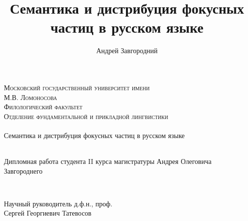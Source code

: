 \documentclass[a4paper, titlepage, 12pt]{article}
\title{Семантика и дистрибуция фокусных частиц в русском языке}
\author{Андрей Завгородний}
\begin{document}
\begin{titlepage}

\newcommand{\HRule}{\rule{\linewidth}{0.5mm}} %

\center %
 

\textsc{\large Московский государственный университет имени \\ М.В. Ломоносова}\\[1.5cm] %
\textsc{\large Филологический факультет}\\[0.5cm] %
\textsc{\large Отделение фундаментальной и прикладной лингвистики}\\[0.5cm] %

~\\[2.0cm]



{ \huge Семантика и дистрибуция фокусных частиц в русском языке}\\[0.4cm] %
 

~\\[3.0cm]

\begin{minipage}{0.4\textwidth}
\begin{flushleft} \large
Дипломная работа студента II курса магистратуры Андрея Олеговича Завгороднего \\
\end{flushleft}
\end{minipage}
~
\begin{minipage}{0.4\textwidth}
\begin{flushright} \large
Научный руководитель д.ф.н., проф. \\  Сергей Георгиевич Татевосов \\
\end{flushright}
\end{minipage}\\[5cm]


\end{titlepage}
\end{document}
